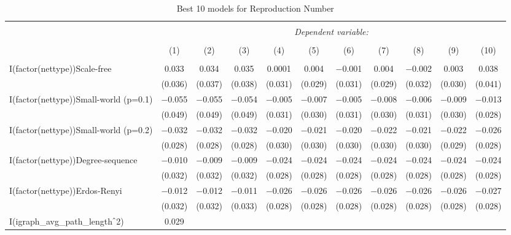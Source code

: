 
\begin{table}[!htbp] \centering 
  \caption{Best 10 models for Reproduction Number} 
  \label{tab:best_models_rep_num} 
\begin{tabular}{@{\extracolsep{5pt}}lcccccccccc} 
\\[-1.8ex]\hline 
\hline \\[-1.8ex] 
 & \multicolumn{10}{c}{\textit{Dependent variable:}} \\ 
\cline{2-11} 
\\[-1.8ex] & (1) & (2) & (3) & (4) & (5) & (6) & (7) & (8) & (9) & (10)\\ 
\hline \\[-1.8ex] 
 I(factor(nettype))Scale-free & 0.033 & 0.034 & 0.035 & 0.0001 & 0.004 & $-$0.001 & 0.004 & $-$0.002 & 0.003 & 0.038 \\ 
  & (0.036) & (0.037) & (0.038) & (0.031) & (0.029) & (0.031) & (0.029) & (0.032) & (0.030) & (0.041) \\ 
  I(factor(nettype))Small-world (p=0.1) & $-$0.055 & $-$0.055 & $-$0.054 & $-$0.005 & $-$0.007 & $-$0.005 & $-$0.008 & $-$0.006 & $-$0.009 & $-$0.013 \\ 
  & (0.049) & (0.049) & (0.049) & (0.031) & (0.030) & (0.031) & (0.030) & (0.031) & (0.030) & (0.028) \\ 
  I(factor(nettype))Small-world (p=0.2) & $-$0.032 & $-$0.032 & $-$0.032 & $-$0.020 & $-$0.021 & $-$0.020 & $-$0.022 & $-$0.021 & $-$0.022 & $-$0.026 \\ 
  & (0.028) & (0.028) & (0.028) & (0.030) & (0.030) & (0.030) & (0.030) & (0.030) & (0.029) & (0.028) \\ 
  I(factor(nettype))Degree-sequence & $-$0.010 & $-$0.009 & $-$0.009 & $-$0.024 & $-$0.024 & $-$0.024 & $-$0.024 & $-$0.024 & $-$0.024 & $-$0.024 \\ 
  & (0.032) & (0.032) & (0.032) & (0.028) & (0.028) & (0.028) & (0.028) & (0.028) & (0.028) & (0.028) \\ 
  I(factor(nettype))Erdos-Renyi & $-$0.012 & $-$0.012 & $-$0.011 & $-$0.026 & $-$0.026 & $-$0.026 & $-$0.026 & $-$0.026 & $-$0.026 & $-$0.027 \\ 
  & (0.032) & (0.032) & (0.033) & (0.028) & (0.028) & (0.028) & (0.028) & (0.028) & (0.028) & (0.028) \\ 
  I(igraph\_avg\_path\_length$\hat{\mkern6mu}$2) & 0.029 &  &  &  &  &  &  &  &  &  \\ 

\end{tabular}
\end{table}
